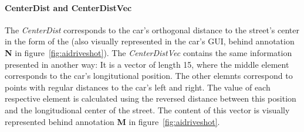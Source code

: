 \paragraph{CenterDist and CenterDistVec} The \emph{CenterDist} corresponds to the car's orthogonal distance to the street's center in the form of the  (also visually represented in the car's GUI, behind annotation \textbf{N} in figure~\ref{fig:aidriveshot}).
The \emph{CenterDistVec} contains the same information presented in another way: It is a vector of length 15, where the middle element corresponds to the car's longitutional position. The other elemnts correspond to points with regular distances to the car's left and right. The value of each respective element is calculated using the reversed distance between this position and the longitudional center of the street. The content of this vector is visually represented behind annotation \textbf{M} in figure~\ref{fig:aidriveshot}.

